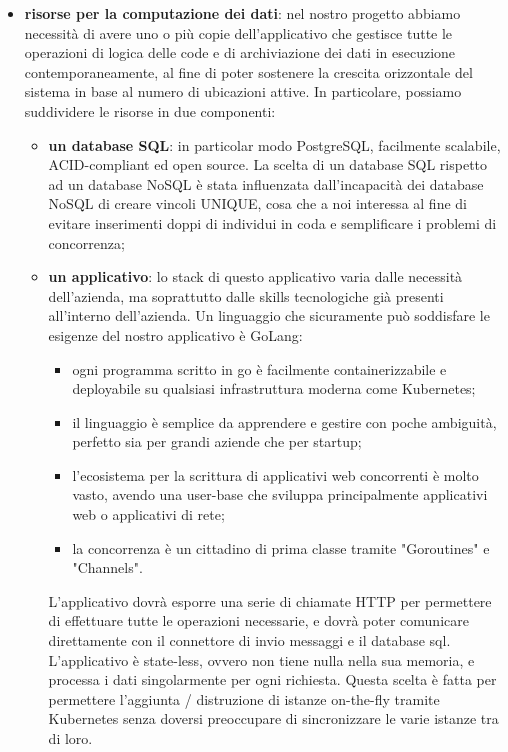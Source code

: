 \documentclass[a4paper, titlepage, 12pt, openright, oneside]{book}
\begin{document}
\begin{itemize}
	\item \textbf{risorse per la computazione dei dati}: nel nostro progetto abbiamo necessità di avere uno o più copie dell'applicativo che gestisce tutte le operazioni
				 di logica delle code e di archiviazione dei dati in esecuzione contemporaneamente, al fine di poter sostenere la crescita orizzontale del sistema in base al numero di ubicazioni attive. In particolare, possiamo suddividere le risorse in due componenti:
				 \begin{itemize}
				 	\item \textbf{un database SQL}: in particolar modo PostgreSQL, facilmente scalabile, ACID-compliant ed open source. La scelta di un database SQL rispetto ad
				 				 un database NoSQL è stata influenzata dall'incapacità dei database NoSQL di creare vincoli UNIQUE, cosa che a noi interessa
				 				 al fine di evitare inserimenti doppi di individui in coda e semplificare i problemi di concorrenza;
				 	\item \textbf{un applicativo}: lo stack di questo applicativo varia dalle necessità dell'azienda, ma soprattutto dalle skills tecnologiche già presenti
				 				 all'interno dell'azienda. Un linguaggio che sicuramente può soddisfare le esigenze del nostro applicativo è GoLang:
				 				 \begin{itemize}
				 				 	\item ogni programma scritto in go è facilmente containerizzabile e deployabile su qualsiasi infrastruttura moderna come Kubernetes;
				 				 	\item il linguaggio è semplice da apprendere e gestire con poche ambiguità, perfetto sia per grandi aziende che per startup;
				 				 	\item l'ecosistema per la scrittura di applicativi web concorrenti è molto vasto, avendo una user-base che sviluppa principalmente 
				 				 		  applicativi web o applicativi di rete;
				 				 	\item la concorrenza è un cittadino di prima classe tramite "Goroutines" e "Channels".
				 				 \end{itemize}
				 				 L'applicativo dovrà esporre una serie di chiamate HTTP per permettere di effettuare tutte le operazioni necessarie,
				 				 e dovrà poter comunicare direttamente con il connettore di invio messaggi e il database sql. L'applicativo è state-less, ovvero non tiene nulla nella sua memoria, e processa i dati singolarmente per ogni richiesta. Questa scelta è fatta per permettere l'aggiunta / distruzione di istanze on-the-fly tramite
				 				 Kubernetes senza doversi preoccupare di sincronizzare le varie istanze tra di loro.
				 \end{itemize}
	

\end{itemize}
\end{document}

